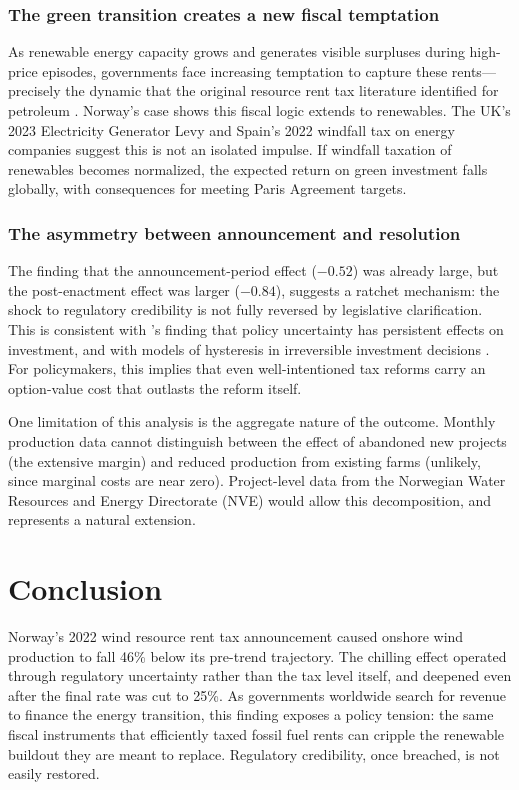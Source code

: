 \documentclass[12pt]{article}
\begin{document}
\subsubsection*{The green transition creates a new fiscal temptation} As renewable energy capacity grows and generates visible surpluses during high-price episodes, governments face increasing temptation to capture these rents---precisely the dynamic that the original resource rent tax literature identified for petroleum \citep{boadway2001rents}. Norway's case shows this fiscal logic extends to renewables. The UK's 2023 Electricity Generator Levy and Spain's 2022 windfall tax on energy companies suggest this is not an isolated impulse. If windfall taxation of renewables becomes normalized, the expected return on green investment falls globally, with consequences for meeting Paris Agreement targets.

\subsubsection*{The asymmetry between announcement and resolution} The finding that the announcement-period effect ($-0.52$) was already large, but the post-enactment effect was larger ($-0.84$), suggests a ratchet mechanism: the shock to regulatory credibility is not fully reversed by legislative clarification. This is consistent with \citet{baker2016measuring}'s finding that policy uncertainty has persistent effects on investment, and with models of hysteresis in irreversible investment decisions \citep{dixit1994investment}. For policymakers, this implies that even well-intentioned tax reforms carry an option-value cost that outlasts the reform itself.

One limitation of this analysis is the aggregate nature of the outcome. Monthly production data cannot distinguish between the effect of abandoned new projects (the extensive margin) and reduced production from existing farms (unlikely, since marginal costs are near zero). Project-level data from the Norwegian Water Resources and Energy Directorate (NVE) would allow this decomposition, and represents a natural extension.


\section{Conclusion}

Norway's 2022 wind resource rent tax announcement caused onshore wind production to fall 46\% below its pre-trend trajectory. The chilling effect operated through regulatory uncertainty rather than the tax level itself, and deepened even after the final rate was cut to 25\%. As governments worldwide search for revenue to finance the energy transition, this finding exposes a policy tension: the same fiscal instruments that efficiently taxed fossil fuel rents can cripple the renewable buildout they are meant to replace. Regulatory credibility, once breached, is not easily restored.
\end{document}
